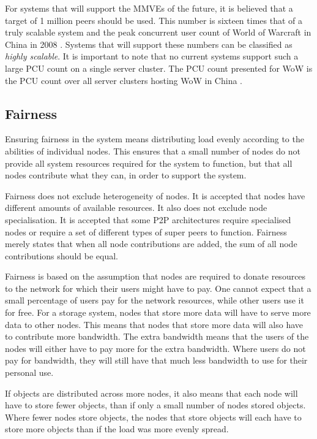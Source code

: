 For systems that will support the MMVEs of the future, it is believed that a target of 1 million peers should be used. This number is sixteen times that of a truly scalable system and the peak concurrent user count of World of Warcraft in China in 2008 \cite{WoW_china_pcu}. Systems that will support these numbers can be classified as \emph{highly scalable}. It is important to note that no current systems support such a large PCU count on a single server cluster. The PCU count presented for WoW is the PCU count over all server clusters hosting WoW in China \cite{WoW_china_pcu}.

\subsection{Fairness}
\label{fairness_requirement}

Ensuring fairness in the system means distributing load evenly according to the abilities of individual nodes. This ensures that a small number of nodes do not provide all system resources required for the system to function, but that all nodes contribute what they can, in order to support the system.

Fairness does not exclude heterogeneity of nodes. It is accepted that nodes have different amounts of available resources. It also does not exclude node specialisation. It is accepted that some P2P architectures require specialised nodes or require a set of different types of super peers to function. Fairness merely states that when all node contributions are added, the sum of all node contributions should be equal.

Fairness is based on the assumption that nodes are required to donate resources to the network for which their users might have to pay. One cannot expect that a small percentage of users pay for the network resources, while other users use it for free. For a storage system, nodes that store more data will have to serve more data to other nodes. This means that nodes that store more data will also have to contribute more bandwidth. The extra bandwidth means that the users of the nodes will either have to pay more for the extra bandwidth. Where users do not pay for bandwidth, they will still have that much less bandwidth to use for their personal use.

If objects are distributed across more nodes, it also means that each node will have to store fewer objects, than if only a small number of nodes stored objects. Where fewer nodes store objects, the nodes that store objects will each have to store more objects than if the load was more evenly spread.

